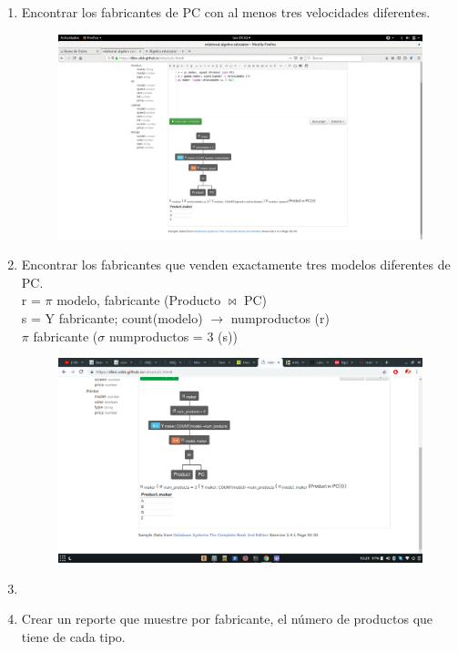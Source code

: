 \documentclass[a4paper, 12pt]{report}
\begin{document}
{\begin{enumerate}[label=\alph*)]
\item{Encontrar los fabricantes de PC con al menos tres velocidades diferentes.\\
    \begin{figure}[H]
        \includegraphics[width=\textwidth]
            {img/k.png}\hfill
    \end{figure}
}
\item{Encontrar los fabricantes que venden exactamente tres modelos
	diferentes de PC.\\
	r = $\pi$ modelo, fabricante (Producto $\Join$ PC)\\
    s = Y fabricante; count(modelo) $\rightarrow$ numproductos (r)\\
    $\pi$ fabricante ($\sigma$ numproductos = 3 (s))\\
    \begin{figure}[H]
        \includegraphics[width=\textwidth]
            {img/l.png}\hfill
    \end{figure}
}
\item{}
\item{Crear un reporte que muestre por fabricante, el número de productos que tiene de cada tipo.\\
}
\end{enumerate}}
\end{document}
